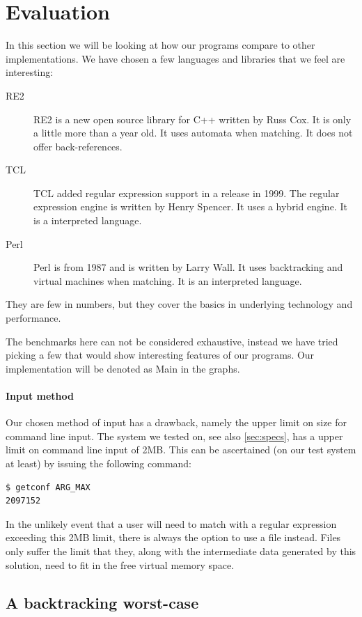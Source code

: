 \section{Evaluation}
\label{sec:evaluation}
In this section we will be looking at how our programs compare to
other implementations. We have chosen a few languages and libraries
that we feel are interesting:
\begin{description}
  \item[RE2] RE2 is a new open source library for C++ written by Russ
    Cox. It is only a little more than a year old. It uses automata
    when matching. It does not offer back-references.
  \item[TCL]
    TCL added regular expression support in a release in 1999. The
    regular expression engine is written by Henry Spencer. It uses a
    hybrid engine. It is a interpreted language.
  \item[Perl] Perl is from 1987 and is written by Larry Wall. It uses
    backtracking and virtual machines when matching. It is an
    interpreted language. 
\end{description}
They are few in numbers, but they cover the basics in underlying
technology and performance. 

The benchmarks here can not be considered exhaustive, instead we have
tried picking a few that would show interesting features of our
programs. Our implementation will be denoted as Main in
the graphs.

\paragraph{Input method}
Our chosen method of input has a drawback, namely the upper limit on
size for command line input. The system we tested on, see also
\vref{sec:specs}, has a upper limit on command line input of 2MB. This
can be ascertained (on our test system at least) by issuing the
following command:
\begin{verbatim}
$ getconf ARG_MAX
2097152
\end{verbatim}
In the unlikely event that a user will need to match with a regular
expression exceeding this 2MB limit, there is always the option to use
a file instead. Files only suffer the limit that they, along with the intermediate data generated by this solution, need to fit in
the free virtual memory space.

\subsection{A backtracking worst-case}

